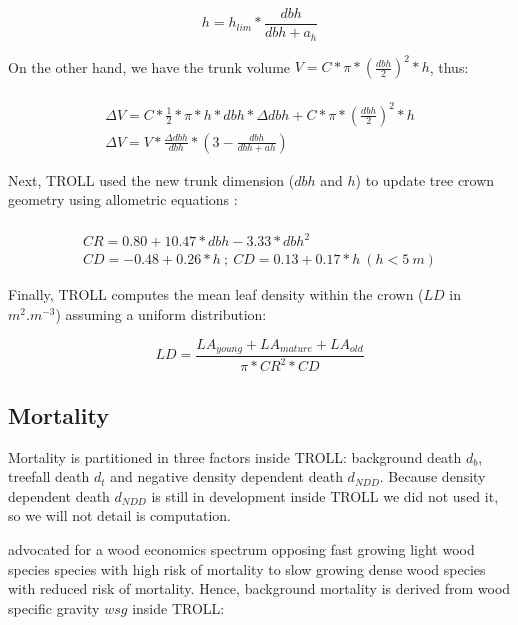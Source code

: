 \documentclass[12pt,]{article}
\theoremstyle{definition}
\theoremstyle{definition}
\theoremstyle{remark}
\begin{document}
\begin{equation}
  h = h_{lim}*\frac{dbh}{dbh + a_h}
  \label{eq:h}
\end{equation}

On the other hand, we have the trunk volume
\(V = C * \pi * (\frac{dbh}{2})^2*h\), thus:

\begin{equation}
  \begin{array}{c} \\
    \Delta V = C*\frac{1}{2}*\pi*h*dbh*\Delta dbh + C * \pi * (\frac{dbh}{2})^2*h \\
    \Delta V = V*\frac{\Delta dbh}{dbh}*(3-\frac{dbh}{dbh + ah})
  \end{array}
  \label{eq:Deltadbh}
\end{equation}

Next, TROLL used the new trunk dimension (\(dbh\) and \(h\)) to update
tree crown geometry using allometric equations \citep{Chave2005}:

\begin{equation}
  \begin{array}{c} \\
    CR = 0.80 + 10.47*dbh - 3.33*dbh^2\\
    CD = -0.48 + 0.26*h~;~CD = 0.13 + 0.17*h~(h<5~m)
  \end{array}
  \label{eq:C}
\end{equation}

Finally, TROLL computes the mean leaf density within the crown (\(LD\)
in \(m^2.m^{-3}\)) assuming a uniform distribution:

\begin{equation}
  LD = \frac{LA_{young}+LA_{mature}+LA_{old}}{\pi*CR^2*CD}
  \label{eq:LD}
\end{equation}

\subsection{Mortality}\label{mortality}

Mortality is partitioned in three factors inside TROLL: background death
\(d_b\), treefall death \(d_t\) and negative density dependent death
\(d_{NDD}\). Because density dependent death \(d_{NDD}\) is still in
development inside TROLL we did not used it, so we will not detail is
computation.

\citet{chave_towards_2009} advocated for a wood economics spectrum
opposing fast growing light wood species species with high risk of
mortality to slow growing dense wood species with reduced risk of
mortality. Hence, background mortality is derived from wood specific
gravity \(wsg\) inside TROLL:
\end{document}

